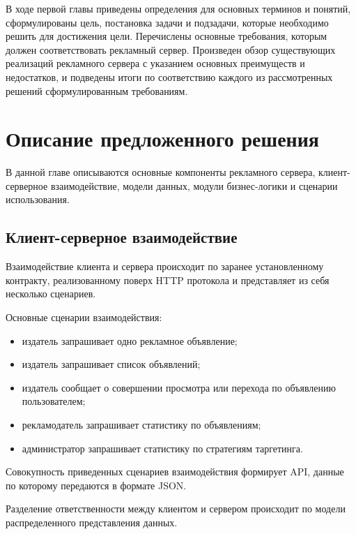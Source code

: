 \documentclass[specification,annotation,times]{itmo-student-thesis}
\begin{document}
\finishrelatedwork %

\chapterconclusion

В ходе первой главы приведены определения для основных терминов и понятий, сформулированы цель, постановка задачи и подзадачи, которые необходимо решить для достижения цели. Перечислены основные требования, которым должен соответствовать рекламный сервер. Произведен обзор существующих реализаций рекламного сервера с указанием основных преимуществ и недостатков, и подведены итоги по соответствию каждого из рассмотренных решений сформулированным требованиям.





\chapter{Описание предложенного решения}\label{chapter:2}

В данной главе описываются основные компоненты рекламного сервера, клиент-серверное взаимодействие, модели данных, модули бизнес-логики и сценарии использования.

\section{Клиент-серверное взаимодействие}

Взаимодействие клиента и сервера происходит по заранее установленному контракту, реализованному поверх HTTP протокола и представляет из себя несколько сценариев. 

Основные сценарии взаимодействия:
\begin{itemize}
\item издатель запрашивает одно рекламное объявление;
\item издатель запрашивает список объявлений;
\item издатель сообщает о совершении просмотра или перехода по объявлению пользователем;
\item рекламодатель запрашивает статистику по объявлениям;
\item администратор запрашивает статистику по стратегиям таргетинга.
\end{itemize}

Совокупность приведенных сценариев взаимодействия формирует API, данные по которому передаются в формате JSON.

Разделение ответственности между клиентом и сервером происходит по модели распределенного представления данных.
\end{document}

